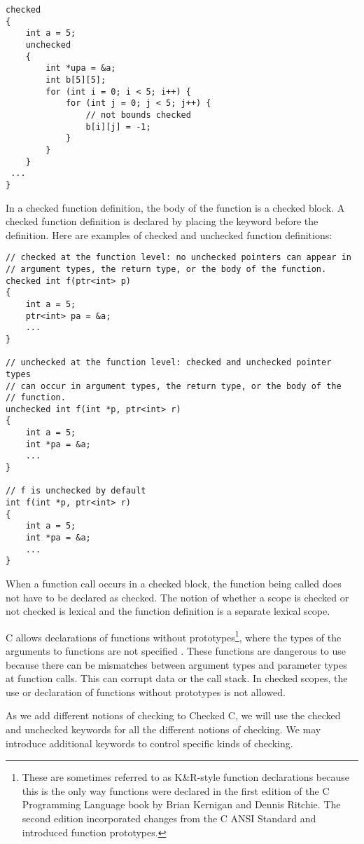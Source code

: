 \begin{lstlisting}
checked 
{
    int a = 5;
    unchecked 
    {
        int *upa = &a;	
        int b[5][5];
        for (int i = 0; i < 5; i++) {
            for (int j = 0; j < 5; j++) {
                // not bounds checked
                b[i][j] = -1;
            }
        }     
    }
 ...
}
\end{lstlisting}

In a checked function definition, the body of the function is a 
checked  block. A checked function definition is declared by placing the
 keyword before the definition. Here are examples of checked and
unchecked function definitions:

\begin{lstlisting}
// checked at the function level: no unchecked pointers can appear in
// argument types, the return type, or the body of the function.
checked int f(ptr<int> p) 
{
    int a = 5;
    ptr<int> pa = &a;
    ...
}

// unchecked at the function level: checked and unchecked pointer types
// can occur in argument types, the return type, or the body of the
// function.
unchecked int f(int *p, ptr<int> r)
{
    int a = 5;
    int *pa = &a;
    ...
}

// f is unchecked by default
int f(int *p, ptr<int> r)
{
    int a = 5;
    int *pa = &a;
    ...
}
\end{lstlisting}

When a function call occurs in a checked block, the function being
called does not have to be declared as checked. The notion of whether a
scope is checked or not checked is lexical and the function definition
is a separate lexical scope.

C allows declarations of functions without prototypes\footnote{These are sometimes
referred to as K\&R-style function declarations because this is the only way
functions were  declared in the first edition of the C Programming Language book
by Brian Kernigan and Dennis Ritchie. The second edition incorporated changes from the
C ANSI Standard and introduced function prototypes.}, where the types
of the arguments to functions are not specified .  These
functions are dangerous to use because there can be mismatches 
between argument types and parameter types at function
calls.  This can corrupt data or the call stack.  In checked scopes, 
the use or declaration of  functions without prototypes is not allowed.

As we add different notions of checking to Checked C, we will use the
checked and unchecked keywords for all the different notions of
checking. We may introduce additional keywords to control specific kinds
of checking.

